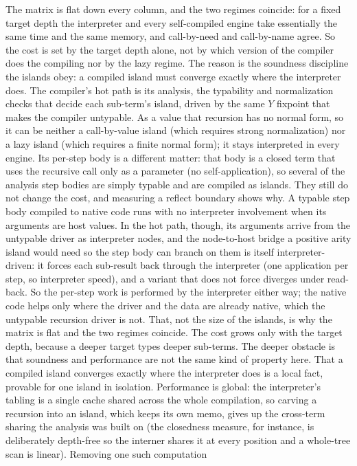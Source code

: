 The matrix is flat down every column, and the two regimes coincide: for a fixed target depth the
interpreter and every self-compiled engine take essentially the same time and the same memory, and
call-by-need and call-by-name agree. So the cost is set by the target depth alone, not by which version
of the compiler does the compiling nor by the lazy regime. The reason is the soundness discipline the
islands obey: a compiled island must converge exactly where the interpreter does. The compiler's hot path
is its analysis, the typability and normalization checks that decide each sub-term's island, driven by
the same $Y$ fixpoint that makes the compiler untypable. As a value that recursion has no normal form, so
it can be neither a call-by-value island (which requires strong normalization) nor a lazy island (which
requires a finite normal form); it stays interpreted in every engine. Its per-step body is a different
matter: that body is a closed term that uses the recursive call only as a parameter (no self-application),
so several of the analysis step bodies are simply typable and are compiled as islands. They still do not
change the cost, and measuring a reflect boundary shows why. A typable step body compiled to native code
runs with no interpreter involvement when its arguments are host values. In the hot path, though, its
arguments arrive from the untypable driver as interpreter nodes, and the node-to-host bridge a positive
arity island would need so the step body can branch on them is itself interpreter-driven: it forces each
sub-result back through the interpreter (one application per step, so interpreter speed), and a variant
that does not force diverges under read-back. So the per-step work is performed by the interpreter either
way; the native code helps only where the driver and the data are already native, which the untypable
recursion driver is not. That, not the size of the islands, is why the matrix is flat and the two regimes
coincide. The cost grows only with the target depth, because a deeper target types deeper sub-terms.
The deeper obstacle is that soundness and performance are not the same kind of property here. That a
compiled island converges exactly where the interpreter does is a local fact, provable for one island in
isolation. Performance is global: the interpreter's tabling is a single cache shared across the whole
compilation, so carving a recursion into an island, which keeps its own memo, gives up the cross-term
sharing the analysis was built on (the closedness measure, for instance, is deliberately depth-free so
the interner shares it at every position and a whole-tree scan is linear). Removing one such computation
